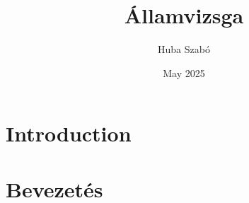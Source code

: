 \documentclass{article}
\title{Államvizsga}
\author{Huba Szabó}
\date{May 2025}
\begin{document}
\maketitle

\section{Introduction}
\section{Bevezetés}
\end{document}
